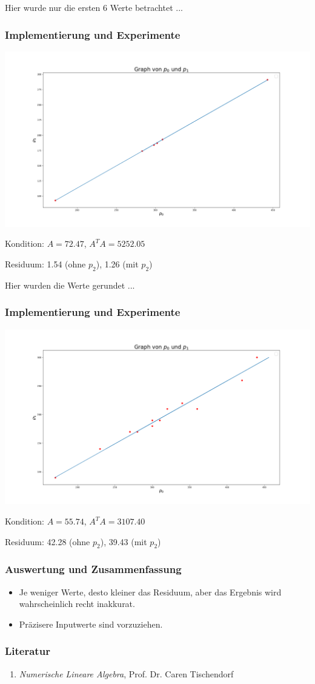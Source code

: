 \documentclass{beamer}
\begin{document}
\begin{frame}
Hier wurde nur die ersten 6 Werte betrachtet ...

\frametitle{Implementierung und Experimente}
\includegraphics[width=\textwidth]{plot1.png}

Kondition: $A = 72.47$, $A^T A = 5252.05$

Residuum: 1.54 (ohne $p_2$), 1.26 (mit $p_2$)
\end{frame}

\begin{frame}
Hier wurden die Werte gerundet ...

\frametitle{Implementierung und Experimente}
\includegraphics[width=\textwidth]{plot2.png}

Kondition: $A = 55.74$, $A^T A = 3107.40$

Residuum: 42.28 (ohne $p_2$), 39.43 (mit $p_2$)
\end{frame}


\begin{frame}
\frametitle{Auswertung und Zusammenfassung}

\begin{itemize}


\item Je weniger Werte, desto kleiner das Residuum, aber das Ergebnis wird wahrscheinlich recht inakkurat.
\item Präzisere Inputwerte sind vorzuziehen.
\end{itemize}

\end{frame}

\begin{frame}
\frametitle{Literatur}
\begin{enumerate}

\item \textit{Numerische Lineare Algebra}, Prof. Dr. Caren Tischendorf

\end{enumerate}

\end{frame}
\end{document}
